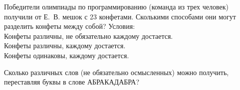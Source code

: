 %
%



\begin{problems}

\item
Победители олимпиады по программированию (команда из трех человек) получили от
Е.~В. мешок с 23 конфетами.
Сколькими способами они могут разделить конфеты между собой?
Условия:
\\
\sbp Конфеты различны, не обязательно каждому достается.
\\
\sbp Конфеты различны, каждому достается.
\\
\sbp Конфеты одинаковы, каждому достается.

\item
Сколько различных слов (не обязательно осмысленных) можно получить, переставляя
буквы в слове АБРАКАДАБРА?


\end{problems}
 
